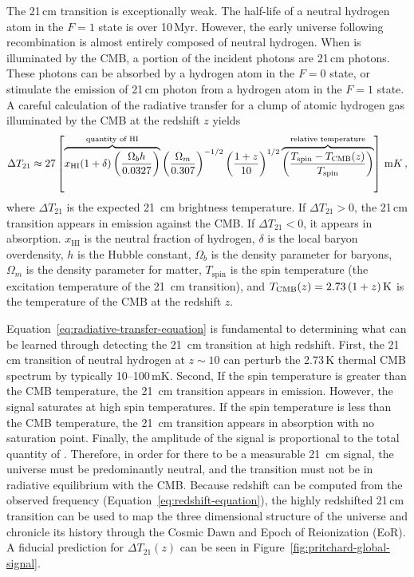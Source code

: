 \begin{bibunit}
The 21\,cm transition is exceptionally weak.  The half-life of a neutral hydrogen atom in the $F=1$
state is over 10\,Myr.  However, the early universe following recombination is almost entirely
composed of neutral hydrogen. When  is illuminated by the CMB, a portion of the incident
photons are 21\,cm photons. These photons can be absorbed by a hydrogen atom in the $F=0$ state, or
stimulate the emission of 21\,cm photon from a hydrogen atom in the $F=1$ state.  A careful
calculation of the radiative transfer for a clump of atomic hydrogen gas illuminated by the CMB at
the redshift $z$ yields \citep[][but neglecting the contribution of peculiar
velocities]{2012RPPh...75h6901P}
\begin{equation}\label{eq:radiative-transfer-equation}
    \Delta T_{21} \approx 27 \left[
        \overbrace{
            x_\text{HI} (1+\delta)
            \left(\frac{\Omega_b h}{0.0327}\right)
        }^{\text{quantity of HI}}
        \left(\frac{\Omega_m}{0.307}\right)^{-1/2}
        \left(\frac{1+z}{10}\right)^{1/2}
        \overbrace{
            \left(\frac{T_\text{spin} - T_\text{CMB}(z)}{T_\text{spin}}\right)
        }^{\text{relative temperature}}
    \right] \, {\rm mK} \,,
\end{equation}
where $\Delta T_{21}$ is the expected 21~cm brightness temperature. If $\Delta T_{21} > 0$, the
21\,cm transition appears in emission against the CMB. If $\Delta T_{21} < 0$, it appears in
absorption. $x_\text{HI}$ is the neutral fraction of hydrogen, $\delta$ is the local baryon
overdensity, $h$ is the Hubble constant, $\Omega_b$ is the density parameter for baryons, $\Omega_m$
is the density parameter for matter, $T_\text{spin}$ is the spin temperature (the excitation
temperature of the 21~cm transition), and $T_\text{CMB}(z) = 2.73\,(1+z)\,{\rm K}$ is the
temperature of the CMB at the redshift $z$.

Equation~\ref{eq:radiative-transfer-equation} is fundamental to determining what can be learned
through detecting the 21~cm transition at high redshift. First, the 21\,cm transition of neutral
hydrogen at $z\sim 10$ can perturb the 2.73\,K thermal CMB spectrum by typically 10--100\,mK.
Second, If the spin temperature is greater than the CMB temperature, the 21~cm transition appears in
emission. However, the signal saturates at high spin temperatures. If the spin temperature is less
than the CMB temperature, the 21~cm transition appears in absorption with no saturation point.
Finally, the amplitude of the signal is proportional to the total quantity of . Therefore,
in order for there to be a measurable 21~cm signal, the universe must be predominantly neutral, and
the transition must not be in radiative equilibrium with the CMB. Because redshift can be computed
from the observed frequency (Equation~\ref{eq:redshift-equation}), the highly redshifted 21\,cm
transition can be used to map the three dimensional structure of the universe and chronicle its
history through the Cosmic Dawn and Epoch of Reionization (EoR).  A fiducial prediction for $\Delta
T_{21}(z)$ can be seen in Figure~\ref{fig:pritchard-global-signal}.


\end{bibunit}
